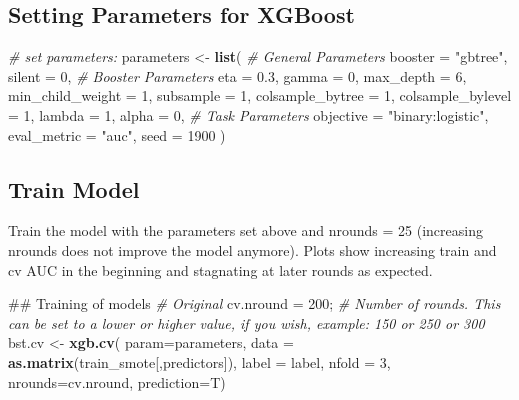\documentclass[11pt,]{article}
\newenvironment{Shaded}{\begin{snugshade}}{\end{snugshade}}
\newcommand{\KeywordTok}[1]{\textcolor[rgb]{0.13,0.29,0.53}{\textbf{#1}}}
\newcommand{\DataTypeTok}[1]{\textcolor[rgb]{0.13,0.29,0.53}{#1}}
\newcommand{\DecValTok}[1]{\textcolor[rgb]{0.00,0.00,0.81}{#1}}
\newcommand{\FloatTok}[1]{\textcolor[rgb]{0.00,0.00,0.81}{#1}}
\newcommand{\StringTok}[1]{\textcolor[rgb]{0.31,0.60,0.02}{#1}}
\newcommand{\CommentTok}[1]{\textcolor[rgb]{0.56,0.35,0.01}{\textit{#1}}}
\newcommand{\NormalTok}[1]{#1}
\begin{document}
\subsection{Setting Parameters for
XGBoost}\label{setting-parameters-for-xgboost}

\begin{Shaded}
\begin{Highlighting}[]
\CommentTok{# set parameters:}
\NormalTok{parameters <-}\StringTok{ }\KeywordTok{list}\NormalTok{(}
  \CommentTok{# General Parameters}
  \DataTypeTok{booster            =} \StringTok{"gbtree"}\NormalTok{,          }
  \DataTypeTok{silent             =} \DecValTok{0}\NormalTok{,                 }
  \CommentTok{# Booster Parameters}
  \DataTypeTok{eta                =} \FloatTok{0.3}\NormalTok{,               }
  \DataTypeTok{gamma              =} \DecValTok{0}\NormalTok{,                 }
  \DataTypeTok{max_depth          =} \DecValTok{6}\NormalTok{,                 }
  \DataTypeTok{min_child_weight   =} \DecValTok{1}\NormalTok{,                 }
  \DataTypeTok{subsample          =} \DecValTok{1}\NormalTok{,                 }
  \DataTypeTok{colsample_bytree   =} \DecValTok{1}\NormalTok{,                 }
  \DataTypeTok{colsample_bylevel  =} \DecValTok{1}\NormalTok{,                 }
  \DataTypeTok{lambda             =} \DecValTok{1}\NormalTok{,                 }
  \DataTypeTok{alpha              =} \DecValTok{0}\NormalTok{,                 }
  \CommentTok{# Task Parameters}
  \DataTypeTok{objective          =} \StringTok{"binary:logistic"}\NormalTok{,   }
  \DataTypeTok{eval_metric        =} \StringTok{"auc"}\NormalTok{,}
  \DataTypeTok{seed               =} \DecValTok{1900}               
\NormalTok{)}
\end{Highlighting}
\end{Shaded}

\subsection{Train Model}\label{train-model}

Train the model with the parameters set above and nrounds = 25
(increasing nrounds does not improve the model anymore). Plots show
increasing train and cv AUC in the beginning and stagnating at later
rounds as expected.

\begin{Shaded}
\begin{Highlighting}[]
\NormalTok{## Training of models}
\CommentTok{# Original}
\NormalTok{cv.nround =}\StringTok{ }\DecValTok{200}\NormalTok{;  }\CommentTok{# Number of rounds. This can be set to a lower or higher value, if you wish, example: 150 or 250 or 300  }
\NormalTok{bst.cv <-}\StringTok{ }\KeywordTok{xgb.cv}\NormalTok{(}
  \DataTypeTok{param=}\NormalTok{parameters,}
  \DataTypeTok{data =} \KeywordTok{as.matrix}\NormalTok{(train_smote[,predictors]),}
  \DataTypeTok{label =}\NormalTok{ label,}
  \DataTypeTok{nfold =} \DecValTok{3}\NormalTok{,}
  \DataTypeTok{nrounds=}\NormalTok{cv.nround,}
  \DataTypeTok{prediction=}\NormalTok{T)}
\end{Highlighting}
\end{Shaded}
\end{document}
